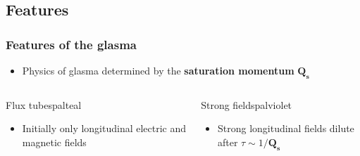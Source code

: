 \documentclass[aspectratio=169,11pt,usenames,dvipsnames]{beamer}
\begin{document}

\subsection{Features}


\begin{frame}
    \frametitle{Features of the glasma}
    \begin{itemize}\itemsep0em 
        \item \begin{center}Physics of glasma determined by the {\bfseries saturation momentum} $\boldsymbol{Q_s}$\end{center}
    \end{itemize}
    \vspace{-10pt}
    \begin{columns}[onlytextwidth,t]

        \begin{custombox2}{{\normalsize Flux tubes}}{palteal}
            \begin{varwidth}{0.99\columnwidth}
            \begin{itemize}\itemsep0em 
                \scriptsize
                \item Initially only longitudinal electric and magnetic fields
            \end{itemize}
            \end{varwidth}
        \end{custombox2}

       \begin{custombox2}{{\normalsize Strong fields}}{palviolet}
            \begin{varwidth}{0.95\columnwidth}
            \begin{itemize}\itemsep0em 
                \scriptsize
                \item Strong longitudinal fields dilute after $\tau\sim 1/\boldsymbol{Q_s}$
            \end{itemize}
            \end{varwidth}
        \end{custombox2}


\end{columns}
\end{frame}
\end{document}
